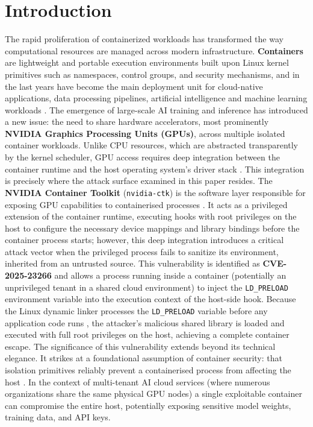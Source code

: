 \section{Introduction}
\label{sec:intro}

The rapid proliferation of containerized workloads has transformed the way computational resources are managed across modern infrastructure.
\textbf{Containers} are lightweight and portable execution environments built upon Linux kernel primitives such as namespaces, control groups, and security mechanisms, and in the last years have become the main deployment unit for cloud-native applications, data processing pipelines, artificial intelligence and machine learning workloads \cite{sultan2019container}.
The emergence of large-scale AI training and inference has introduced a new issue: the need to share hardware accelerators, most prominently \textbf{NVIDIA Graphics Processing Units (GPUs)}, across multiple isolated container workloads.
Unlike CPU resources, which are abstracted transparently by the kernel scheduler, GPU access requires deep integration between the container runtime and the host operating system's driver stack \cite{nvidia_ctk_docs}. This integration is precisely where the attack surface examined in this paper resides.
The \textbf{NVIDIA Container Toolkit} (\texttt{nvidia-ctk}) is the software layer responsible for exposing GPU capabilities to containerised processes \cite{nvidia_ctk_github}.
It acts as a privileged extension of the container runtime, executing hooks with root privileges on the host to configure the necessary device mappings and library bindings before the container process starts; however, this deep integration introduces a critical attack vector when the privileged process fails to sanitize its environment, inherited from an untrusted source.
This vulnerability is identified as \textbf{CVE-2025-23266} \cite{nvd_cve_2025_23266} and allows a process running inside a container (potentially an unprivileged tenant in a shared cloud environment) to inject the \texttt{LD\_PRELOAD} environment variable into the execution context of the host-side hook.
Because the Linux dynamic linker processes the \texttt{LD\_PRELOAD} variable before any application code runs \cite{linux_ldso_manpage}, the attacker's malicious shared library is loaded and executed with full root privileges on the host, achieving a complete container escape.
The significance of this vulnerability extends beyond its technical elegance. It strikes at a foundational assumption of container security: that isolation primitives reliably prevent a containerised process from affecting the host \cite{lin2018measurement}. In the context of multi-tenant AI cloud services (where numerous organizations share the same physical GPU nodes) a single exploitable container can compromise the entire host, potentially exposing sensitive model weights, training data, and API keys.

